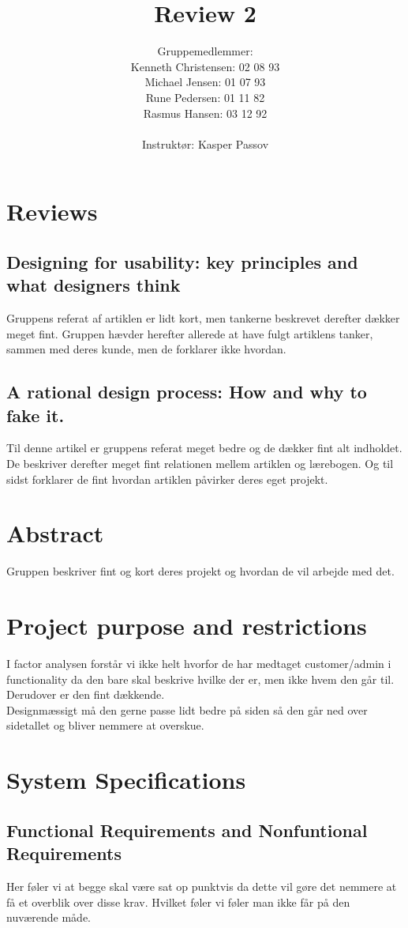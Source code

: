 \documentclass[a4paper]{article}
\title{Review 2}
\author{Gruppemedlemmer:\\
Kenneth Christensen: 02 08 93\\Michael Jensen: 01 07 93\\Rune Pedersen: 01 11 82\\Rasmus Hansen: 03 12 92
\\\\
Instruktør: Kasper Passov}
\begin{document}
\maketitle
\pagebreak
\section*{Reviews}
\subsection*{Designing for usability: key principles and what designers think}
Gruppens referat af artiklen er lidt kort, men tankerne beskrevet derefter dækker meget fint. Gruppen hævder herefter allerede at have fulgt artiklens tanker, sammen med deres kunde, men de forklarer ikke hvordan.
\subsection*{A rational design process: How and why to fake it.}
Til denne artikel er gruppens referat meget bedre og de dækker fint alt indholdet. De beskriver derefter meget fint relationen mellem artiklen og lærebogen. Og til sidst forklarer de fint hvordan artiklen påvirker deres eget projekt.
\section*{Abstract}
Gruppen beskriver fint og kort deres projekt og hvordan de vil arbejde med det.
\section*{Project purpose and restrictions}
I factor analysen forstår vi ikke helt hvorfor de har medtaget customer/admin i functionality da den bare skal beskrive hvilke der er, men ikke hvem den går til.\\
Derudover er den fint dækkende.\\
Designmæssigt må den gerne passe lidt bedre på siden så den går ned over sidetallet og bliver nemmere at overskue.
\section*{System Specifications}
\subsection*{Functional Requirements and Nonfuntional Requirements}
Her føler vi at begge skal være sat op punktvis da dette vil gøre det nemmere at få et overblik over disse krav. Hvilket føler vi føler man ikke får på den nuværende måde.
\end{document}
